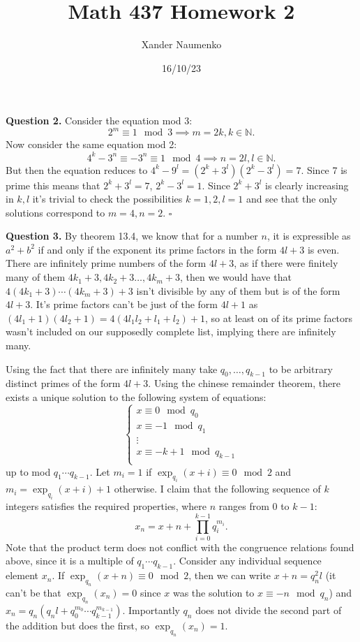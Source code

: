 \documentclass[letterpaper, reqno,11pt]{article}
\begin{document}
\title{Math 437 Homework 2}
\date{16/10/23}
\author{Xander Naumenko}
\maketitle

{\medskip\noindent\bf Question 2.} Consider the equation mod 3:
\[
2^{m}\equiv 1\mod 3\implies m=2k, k\in \mathbb{N}
.\]
Now consider the same equation mod 2:
\[
4^{k}-3^{n}\equiv -3^{n}\equiv 1\mod 4\implies n=2l, l\in \mathbb{N}
.\]
But then the equation reduces to $4^{k}-9^{l}=(2^{k}+3^{l})(2^{k}-3^{l})=7$. Since 7 is prime this means that $2^{k}+3^{l}=7$, $2^{k}-3^{l}=1$. Since $2^{k}+3^{l}$ is clearly increasing in $k,l$ it's trivial to check the possibilities $k=1,2,l=1$ and see that the only solutions correspond to $m=4,n=2$. $\square$

{\medskip\noindent\bf Question 3.} By theorem 13.4, we know that for a number $n$, it is expressible as $a^2+b^2$ if and only if the exponent its prime factors in the form $4l+3$ is even. There are infinitely prime numbers of the form $4l+3$, as if there were finitely many of them $4k_1+3,4k_2+3\ldots, 4k_m+3$, then we would have that $4(4k_1+3)\cdots (4k_m+3)+3$ isn't divisible by any of them but is of the form $4l+3$. It's prime factors can't be just of the form $4l+1$ as $(4l_1+1)(4l_2+1)=4(4l_1l_2+l_1+l_2)+1$, so at least on of its prime factors wasn't included on our supposedly complete list, implying there are infinitely many.

Using the fact that there are infinitely many take $q_0,\ldots, q_{k-1}$ to be arbitrary distinct primes of the form $4l+3$. Using the chinese remainder theorem, there exists a unique solution to the following system of equations:
\[
\begin{cases}
    
x\equiv 0\mod q_0\\
x\equiv -1\mod q_1\\
\vdots\\
x\equiv -k+1\mod q_{k-1}\\
\end{cases}
\]
up to mod $q_1\cdots q_{k-1}$. Let $m_i=1$ if $\exp_{q_i}(x+i)\equiv 0\mod 2$ and $m_i=\exp_{q_i}(x+i)+1$ otherwise. I claim that the following sequence of $k$ integers satisfies the required properties, where $n$ ranges from 0 to $k-1$:
\[
    x_n=x+n+\prod_{i=0}^{k-1}q_i^{m_i}
.\]
Note that the product term does not conflict with the congruence relations found above, since it is a multiple of $q_1\cdots q_{k-1}$. Consider any individual sequence element $x_n$. If $\exp_{q_{n}}(x+n)\equiv 0\mod 2$, then we can write $x+n=q_n^2l$ (it can't be that $\exp_{q_n}(x_n)=0$ since $x$ was the solution to $x\equiv -n\mod q_n$) and $x_n=q_n(q_nl+q_0^{m_0}\cdots q_{k-1}^{m_{k-1}})$. Importantly $q_n$ does not divide the second part of the addition but does the first, so $\exp_{q_n}(x_n)=1$.
\end{document}
